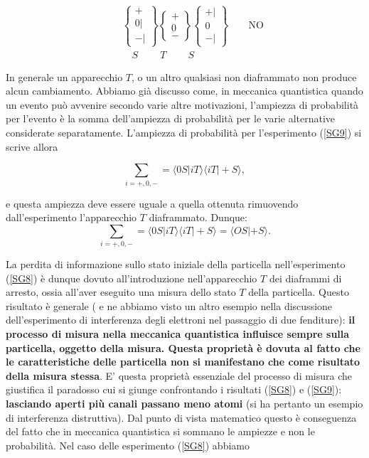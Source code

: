 \begin{eqnarray}
& &\begin{Bmatrix}
 + \\ 0 | \\ - |  
\end{Bmatrix}
\begin{Bmatrix}
 +  \\ 0  \\ -   
\end{Bmatrix}
\begin{Bmatrix}
 + | \\ 0  \\ - |  
\end{Bmatrix} \qquad \text{NO} \\
& & \quad S  \ \qquad T\ \qquad S \nonumber
\label{SG9}
\end{eqnarray}

In generale un apparecchio $T$, o un altro qualsiasi non diaframmato non produce alcun cambiamento. Abbiamo già discusso come, in meccanica quantistica quando un evento può avvenire secondo varie altre motivazioni, l'ampiezza di probabilità per l'evento è la somma dell'ampiezza di probabilità per le varie alternative considerate separatamente. L'ampiezza di probabilità per l'esperimento (\ref{SG9}) si scrive allora

\begin{equation}
\sum\limits_{i=+,0,-}=\langle 0S | iT \rangle \langle iT | +S \rangle ,
\end{equation}

e questa ampiezza deve essere uguale a quella ottenuta rimuovendo  dall'esperimento l'apparecchio $T$ diaframmato. Dunque:
\begin{equation}
\sum\limits_{i=+,0,-}=\langle 0S | iT \rangle \langle iT | +S \rangle = \langle OS | +S \rangle .
 \label{cap3_2}
\end{equation}

La perdita di informazione sullo stato iniziale della particella nell'esperimento (\ref{SG8}) è dunque dovuto all'introduzione nell'apparecchio $T$ dei diaframmi di arresto, ossia all'aver eseguito una misura dello stato $T$ della particella. Questo risultato è generale ( e ne abbiamo visto un altro esempio nella discussione dell'esperimento di interferenza degli elettroni nel passaggio di due fenditure): \textbf{il processo di misura nella meccanica quantistica influisce sempre sulla particella, oggetto della misura. Questa proprietà è dovuta al fatto che le caratteristiche delle particella non si manifestano che come risultato della misura stessa}.
E' questa proprietà essenziale del processo di misura che giustifica il paradosso cui si giunge confrontando i risultati (\ref{SG8}) e (\ref{SG9}): \textbf{lasciando aperti più canali passano meno atomi} (si ha pertanto un esempio di interferenza distruttiva). Dal punto di vista matematico questo è conseguenza del fatto che in meccanica quantistica si sommano le ampiezze e non le probabilità.
Nel caso delle esperimento (\ref{SG8}) abbiamo


